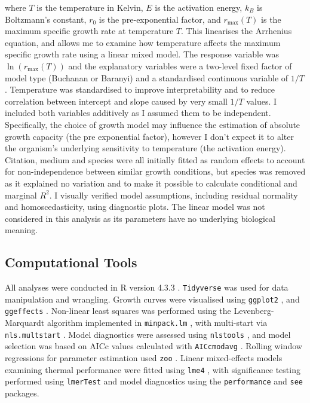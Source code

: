 \documentclass[11pt]{article}
\begin{document}
where $T$ is the temperature in Kelvin, $E$ is the activation energy, $k_B$ is Boltzmann's constant,
$r_0$ is the pre-exponential factor, and $r_{\max}(T)$ is the maximum
specific growth rate at temperature $T$.
This linearises the Arrhenius equation, and allows me to examine how temperature affects the 
maximum specific growth rate using a linear mixed model. The response variable was 
$\ln(r_{\max}(T))$ and the explanatory variables were a two-level fixed factor of model type 
(Buchanan or Baranyi) and a standardised continuous variable of $1/T$. Temperature was 
standardised to improve interpretability and to reduce correlation between intercept and 
slope caused by very small $1/T$ values. 
I included both variables additively as I assumed them to be independent. Specifically, the 
choice of growth model may influence the estimation of absolute growth capacity (the pre 
exponential factor), however I don't expect it to alter the organism's underlying sensitivity 
to temperature (the activation energy). Citation, medium and species were all initially 
fitted as random effects to account for non-independence between similar growth conditions, 
but species was removed as it explained no variation and to make it possible to calculate 
conditional and marginal $R^2$. I visually verified model assumptions, including residual 
normality and homoscedasticity, using diagnostic plots. The linear model was not considered 
in this analysis as its parameters have no underlying biological meaning.



\subsection{Computational Tools}

All analyses were conducted in R version 4.3.3 \citep{R}. \texttt{Tidyverse} 
\citep{tidyverse} was used for data manipulation and wrangling. Growth curves were 
visualised using \texttt{ggplot2} \citep{ggplot}, and \texttt{ggeffects} \citep{ggeffects}. 
Non-linear least squares was performed using the Levenberg-Marquardt algorithm implemented 
in \texttt{minpack.lm} \citep{minpack}, with multi-start via \texttt{nls.multstart} 
\citep{multstart}. Model diagnostics were assessed using \texttt{nlstools} \citep{nls}, and 
model selection was based on AICc values calculated with \texttt{AICcmodavg} 
\citep{AICcmodavg-package}. Rolling window regressions for parameter estimation used 
\texttt{zoo} \citep{zoo}. Linear mixed-effects models examining thermal performance were 
fitted using \texttt{lme4} \citep{lmer4}, with significance testing performed using 
\texttt{lmerTest} \citep{lmer_test} and model diagnostics using the \texttt{performance} 
\citep{performance} and \texttt{see} \citep{see} packages.
\end{document}
